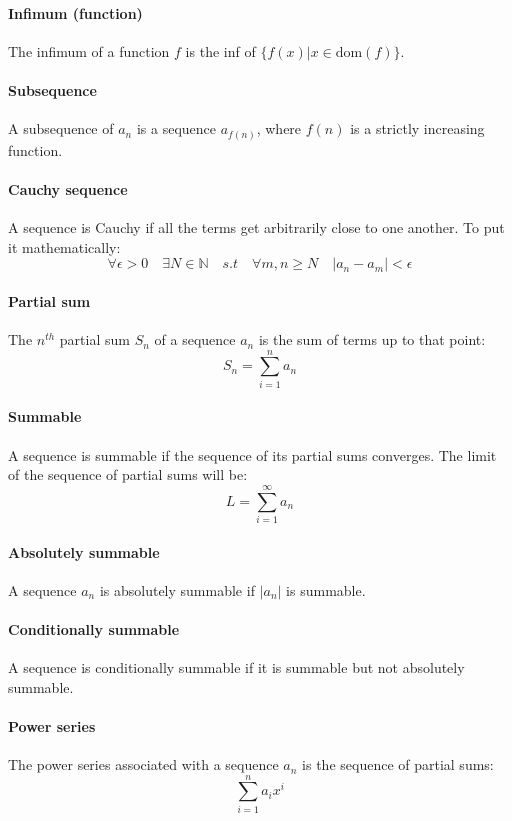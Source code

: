 \documentclass{article}
\newcommand{\N}{\mathbb{N}}
\begin{document}
\paragraph{Infimum (function)}
The infimum of a function $ f $ is the inf of $ \{f(x) | x \in \textrm{dom}(f)\} $.
\paragraph{Subsequence}
A subsequence of $ a_{n} $ is a sequence $ a_{f(n)} $, where $ f(n) $ is a strictly increasing function.
\paragraph{Cauchy sequence}
A sequence is Cauchy if all the terms get arbitrarily close to one another. To put it mathematically:
\begin{equation}
\forall \epsilon > 0 \quad \exists N \in \N \quad s.t \quad \forall m,n \geq N \quad |a_{n} - a_{m}| < \epsilon
\end{equation}
\paragraph{Partial sum}
The $ n^{th} $ partial sum $ S_{n} $ of a sequence $ a_{n} $ is the sum of terms up to that point:
\begin{equation}
S_{n} = \sum_{i=1}^{n} a_{n}
\end{equation}
\paragraph{Summable}
A sequence is summable if the sequence of its partial sums converges. The limit of the sequence of partial sums will be:
\begin{equation}
L = \sum_{i=1}^{\infty} a_{n}
\end{equation}
\paragraph{Absolutely summable}
A sequence $ a_{n} $ is absolutely summable if $ |a_{n}| $ is summable.
\paragraph{Conditionally summable}
A sequence is conditionally summable if it is summable but not absolutely summable.
\paragraph{Power series}
The power series associated with a sequence $ a_{n} $ is the sequence of partial sums:
\begin{equation}
\sum_{i=1}^{n} a_{i}x^{i}
\end{equation}
\end{document}
